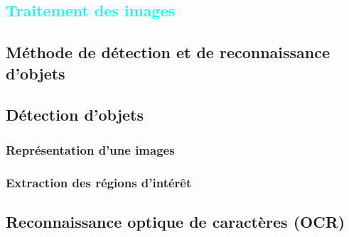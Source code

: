 
%
%

\textcolor{cyan}{\chapter{Traitement des images}}

\section{Méthode de détection et de reconnaissance d'objets}
\lipsum[1]

\section{Détection d'objets }
\subsection{Représentation d'une images}
\lipsum[1]
\lipsum[2]

\subsection{Extraction des régions d'intérêt}
\lipsum[1]

\section{Reconnaissance optique de caractères (OCR)}
\lipsum[1]